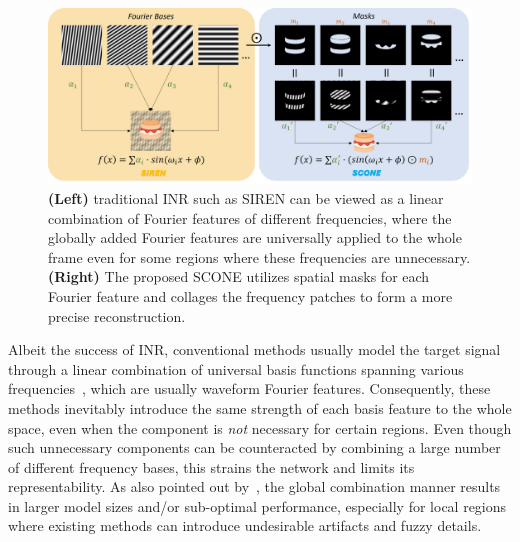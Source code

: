 \documentclass[letterpaper]{article} %
\begin{document}
\begin{figure}[ht]
    \centering
    \includegraphics[width=1\columnwidth]{Figures/Picture1.png}
    \caption{\textbf{(Left)} traditional INR such as SIREN can be viewed as a linear combination of Fourier features of different frequencies, where the globally added Fourier features are universally applied to the whole frame even for some regions where these frequencies are unnecessary. \textbf{(Right)} The proposed SCONE utilizes spatial masks for each Fourier feature and collages the frequency patches to form a more precise reconstruction. }
    \label{fig:idea}
\end{figure}

Albeit the success of INR, conventional methods usually model the target signal through a linear combination of universal basis functions spanning various frequencies~\cite{2020siren, tancik2020fourier, fathony2020multiplicative}, which are usually waveform Fourier features. Consequently, these methods inevitably introduce the same strength of each basis feature to the whole space, even when the component is \textit{not} necessary for certain regions. Even though such unnecessary components can be counteracted by combining a large number of different frequency bases, this strains the network and limits its representability. As also pointed out by~\cite{dou2023multiplicative}, the global combination manner results in larger model sizes and/or sub-optimal performance, especially for local regions where existing methods can introduce undesirable artifacts and fuzzy details.
\end{document}
